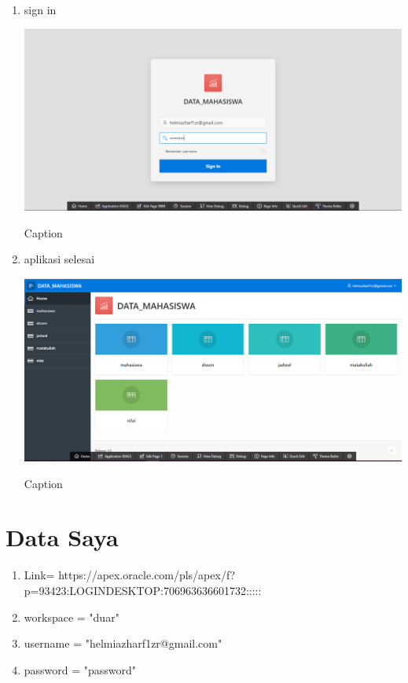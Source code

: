 ﻿\documentclass{article}
\begin{document}
\begin{enumerate}
                                        \item sign in
    \begin{center}
        \centering
        \includegraphics[scale=0.4]{figures/17.PNG}
        \caption{Caption}
        \label{fig:my_label}
    \end{center}
    
                                            \item aplikasi selesai
    \begin{center}
        \centering
        \includegraphics[scale=0.4]{figures/18.PNG}
        \caption{Caption}
        \label{fig:my_label}
    \end{center}
    
    \end{enumerate}
    
\section{Data Saya}
\begin{enumerate}
    \item Link= https://apex.oracle.com/pls/apex/f?p=93423:LOGIN\textunderscore DESKTOP:706963636601732:::::
    \item workspace = "duar"
    \item username = "helmiazharf1zr@gmail.com"
    \item password = "password"
\end{enumerate}

    
\end{document}
